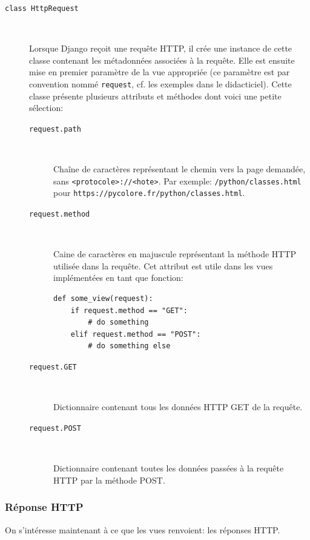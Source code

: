 \documentclass[a4paper, 10pt]{article}
\begin{document}
\begin{description}
    \item[\texttt{class HttpRequest}]~

    Lorsque Django reçoit une requête HTTP, il crée une instance de cette classe contenant les métadonnées associées à la requête. Elle est ensuite mise en premier paramètre de la vue appropriée (ce paramètre est par convention nommé \texttt{request}, cf. les exemples dans le didacticiel). Cette classe présente plusieurs attributs et méthodes dont voici une petite sélection:
        
    \begin{description}
        \item[\texttt{request.path}]~
        
        Chaîne de caractères représentant le chemin vers la page demandée, sans \texttt{<protocole>://<hote>}.
        Par exemple: \texttt{/python/classes.html} pour \texttt{https://pycolore.fr/python/classes.html}.

        \item[\texttt{request.method}]~
            
        Caine de caractères en majuscule représentant la méthode HTTP utilisée dans la requête.
        Cet attribut est utile dans les vues implémentées en tant que fonction:

        \begin{verbatim}
def some_view(request):
    if request.method == "GET":
        # do something
    elif request.method == "POST":
        # do something else
        \end{verbatim}

        \item[\texttt{request.GET}]~
            
        Dictionnaire contenant tous les données HTTP GET de la requête.

        \item[\texttt{request.POST}]~
            
        Dictionnaire contenant toutes les données passées à la requête HTTP par la méthode POST.
    \end{description}
\end{description}

\subsubsection{Réponse HTTP}
On  s'intéresse maintenant à ce que les vues renvoient: les réponses HTTP.
\end{document}
